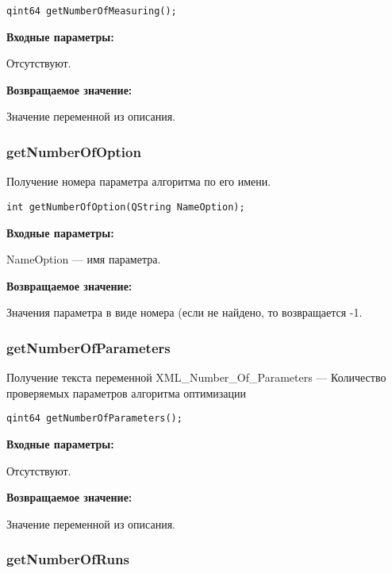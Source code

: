 \begin{lstlisting}[label=code_syntax_getNumberOfMeasuring,caption=Синтаксис]
qint64 getNumberOfMeasuring();
\end{lstlisting}

\textbf{Входные параметры:}

Отсутствуют.

\textbf{Возвращаемое значение:}

Значение переменной из описания.


\subsubsection{getNumberOfOption}\label{getNumberOfOption}

Получение номера параметра алгоритма по его имени.


\begin{lstlisting}[label=code_syntax_getNumberOfOption,caption=Синтаксис]
int getNumberOfOption(QString NameOption);
\end{lstlisting}

\textbf{Входные параметры:}

NameOption --- имя параметра.

\textbf{Возвращаемое значение:}

Значения параметра в виде номера (если не найдено, то возвращается -1.


\subsubsection{getNumberOfParameters}\label{getNumberOfParameters}

Получение текста переменной  XML\_Number\_Of\_Parameters --- Количество проверяемых параметров алгоритма оптимизации


\begin{lstlisting}[label=code_syntax_getNumberOfParameters,caption=Синтаксис]
qint64 getNumberOfParameters();
\end{lstlisting}

\textbf{Входные параметры:}

Отсутствуют.

\textbf{Возвращаемое значение:}

Значение переменной из описания.


\subsubsection{getNumberOfRuns}\label{getNumberOfRuns}

